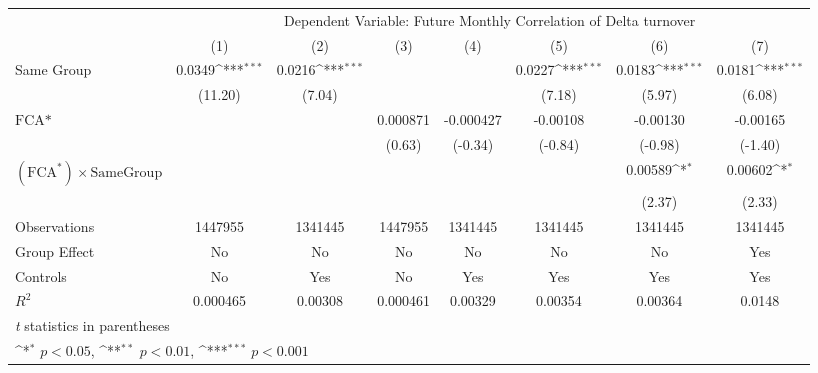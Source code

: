 {
\def\sym#1{\ifmmode^{#1}\else\(^{#1}\)\fi}
\begin{tabular}{l*{7}{c}}
\hline\hline
                &\multicolumn{7}{c}{Dependent Variable: Future Monthly Correlation of Delta turnover}                                                \\\cmidrule(lr){2-8}
                &\multicolumn{1}{c}{(1)}         &\multicolumn{1}{c}{(2)}         &\multicolumn{1}{c}{(3)}         &\multicolumn{1}{c}{(4)}         &\multicolumn{1}{c}{(5)}         &\multicolumn{1}{c}{(6)}         &\multicolumn{1}{c}{(7)}         \\
\hline
Same Group      &   0.0349\sym{***}&   0.0216\sym{***}&                  &                  &   0.0227\sym{***}&   0.0183\sym{***}&   0.0181\sym{***}\\
                &  (11.20)         &   (7.04)         &                  &                  &   (7.18)         &   (5.97)         &   (6.08)         \\
[1em]
$ \text{FCA*} $ &                  &                  & 0.000871         &-0.000427         & -0.00108         & -0.00130         & -0.00165         \\
                &                  &                  &   (0.63)         &  (-0.34)         &  (-0.84)         &  (-0.98)         &  (-1.40)         \\
[1em]
 $ (\text{FCA}^*) \times {\text{SameGroup} }  $ &                  &                  &                  &                  &                  &  0.00589\sym{*}  &  0.00602\sym{*}  \\
                &                  &                  &                  &                  &                  &   (2.37)         &   (2.33)         \\
\hline
Observations    &  1447955         &  1341445         &  1447955         &  1341445         &  1341445         &  1341445         &  1341445         \\
Group Effect    &       No         &       No         &       No         &       No         &       No         &       No         &      Yes         \\
Controls        &       No         &      Yes         &       No         &      Yes         &      Yes         &      Yes         &      Yes         \\
$ R^2 $         & 0.000465         &  0.00308         & 0.000461         &  0.00329         &  0.00354         &  0.00364         &   0.0148         \\
\hline\hline
\multicolumn{8}{l}{\footnotesize \textit{t} statistics in parentheses}\\
\multicolumn{8}{l}{\footnotesize \sym{*} \(p<0.05\), \sym{**} \(p<0.01\), \sym{***} \(p<0.001\)}\\
\end{tabular}
}
